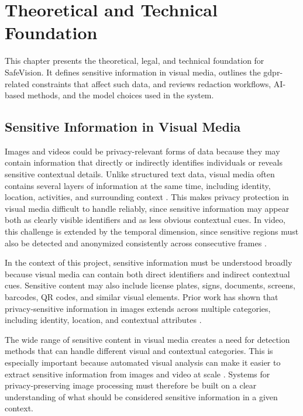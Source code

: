 \chapter{Theoretical and Technical Foundation}
\label{chap:theoretical_foundation}

This chapter presents the theoretical, legal, and technical foundation for \gls{SafeVision}. It defines sensitive information in visual media, outlines the \acrshort{gdpr}-related constraints that affect such data, and reviews redaction workflows,
AI-based methods, and the model choices used in the system.



\section{Sensitive Information in Visual Media}
\label{sec:sensitive_information_in_vm}
Images and videos could be privacy-relevant forms of data because they may contain information that directly or indirectly identifies individuals or reveals sensitive contextual details. Unlike structured text data, visual media often contains several layers of information at the same time, including identity, location, activities, and surrounding context \cite{zhao2023visual, li2024image}. This makes privacy protection in visual media difficult to handle reliably, since sensitive information may appear both as clearly visible identifiers and as less obvious contextual cues. In video, this challenge is extended by the temporal dimension, since sensitive regions must also be detected and anonymized consistently across consecutive frames \cite{bewley2016sort, wojke2017deepsort}.

In the context of this project, sensitive information must be understood broadly because visual media can contain both direct identifiers and indirect contextual cues. Sensitive content may also include license plates, signs, documents, screens, barcodes, QR codes, and similar visual elements. Prior work has shown that privacy-sensitive information in images extends across multiple categories, including identity, location, and contextual attributes \cite{li2024image}.

The wide range of sensitive content in visual media creates a need for detection methods that can handle different visual and contextual categories. This is especially important because automated visual analysis can make it easier to extract sensitive information from images and video at scale \cite{cvprivacy2023, frompixelstoprivacy}. Systems for privacy-preserving image processing must therefore be built on a clear understanding of what should be considered sensitive information in a given context.


